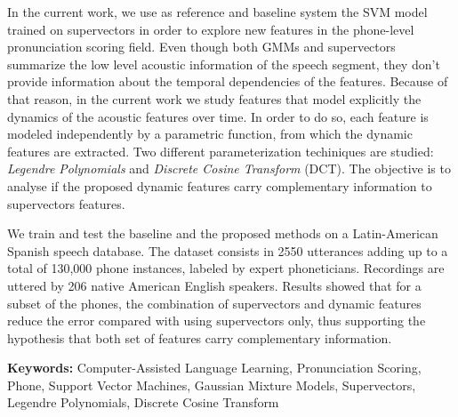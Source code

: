 In the current work, we use as reference and baseline system the SVM model
trained on supervectors in order to explore new features in the
phone-level pronunciation scoring field.
Even though both GMMs and supervectors
summarize the low level acoustic information of the speech segment,
they don't provide information about the temporal dependencies of the features.
Because of that reason, in the current work we study
features that model explicitly the dynamics of the
acoustic features over time. In order to do so, each feature is modeled independently
by a parametric function, from which the dynamic features are extracted.
Two different parameterization techiniques are studied:
\textit{Legendre Polynomials} and \textit{Discrete Cosine Transform} (DCT).
The objective is to analyse if the proposed dynamic features carry
complementary information to supervectors features.

We train and test the baseline and the proposed methods on a
Latin-American Spanish speech database.
The dataset consists in 2550 utterances adding up to a total of
130,000 phone instances, labeled
by expert phoneticians. Recordings are uttered by 206 native American English speakers.
Results showed that for a subset of the phones, the combination of supervectors and
dynamic features reduce the error compared with using supervectors only, thus supporting
the hypothesis that both set of features carry complementary information.

\bigskip

\noindent\textbf{Keywords:} Computer-Assisted Language Learning, Pronunciation Scoring, Phone, Support Vector Machines, Gaussian Mixture Models, Supervectors, Legendre Polynomials, Discrete Cosine Transform
